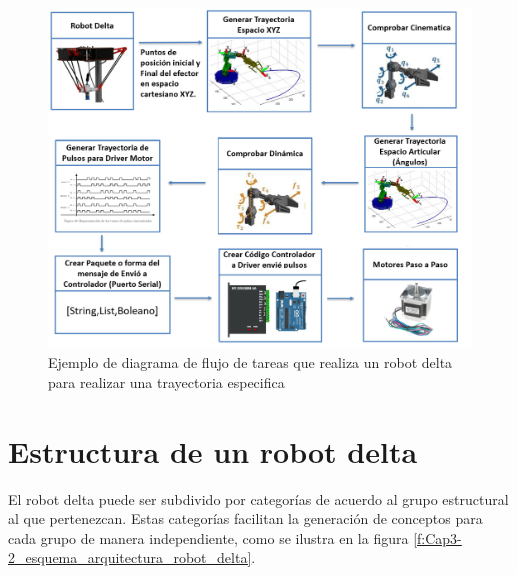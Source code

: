     \begin{figure}[h]
        \centering
        \includegraphics[width=1\linewidth]{Main/Chapter3/Images3/3-1/diagrama-de-flujo-robot.png}
        \caption{Ejemplo de diagrama de flujo de tareas que realiza un robot delta para realizar una trayectoria especifica}
        \label{f:Cap3-1_diagrama_de_flujo_robot_accion}
    \end{figure}
        \newpage
        
\section{Estructura de un robot delta}

    El robot delta puede ser subdivido por categorías de acuerdo al grupo estructural al que pertenezcan. Estas categorías facilitan la generación de conceptos para cada grupo de manera independiente, como se ilustra en la figura \ref{f:Cap3-2_esquema_arquitectura_robot_delta}.
    
